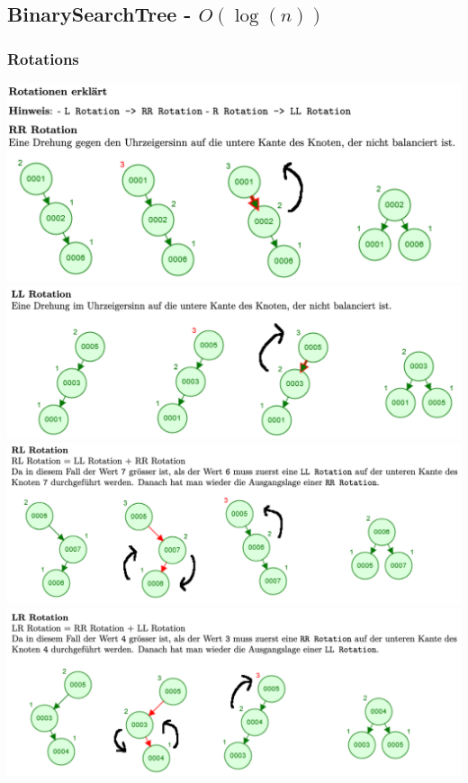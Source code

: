 \documentclass[a4paper, landscape, 8pt]{scrartcl}
\begin{document}
\begin{multicols*}{4}
            \subsection{BinarySearchTree - $O(\log(n))$}
                \subsubsection{Rotations}
                    \includegraphics[scale=0.15]{graphic/22_avl_baum_rr-rotation}
                    \includegraphics[scale=0.15]{graphic/23_avl_baum_ll-rotation}
                    \includegraphics[scale=0.15]{graphic/24_avl_baum_rl-rotation}
                    \includegraphics[scale=0.15]{graphic/25_avl_baum_lr-rotation}


\end{multicols*}
\end{document}
